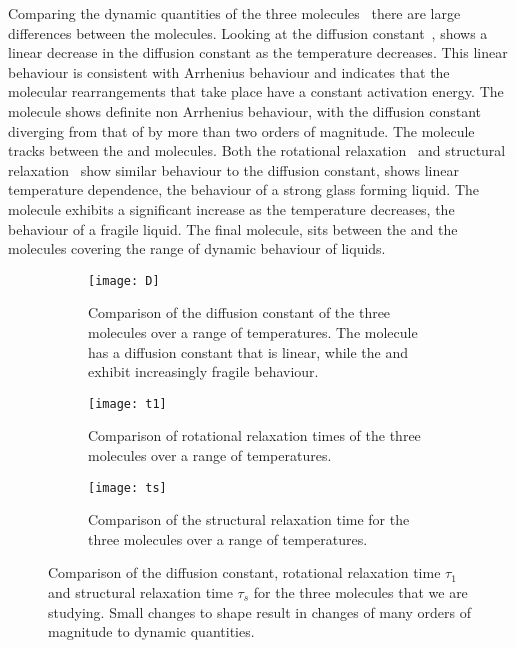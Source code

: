 Comparing the dynamic quantities of the three molecules~ there are large differences between the molecules. Looking at the diffusion constant~, \done shows a linear decrease in the diffusion constant as the temperature decreases. This linear behaviour is consistent with Arrhenius behaviour and indicates that the molecular rearrangements that take place have a constant activation energy. The \dcon molecule shows definite non Arrhenius behaviour, with the diffusion constant diverging from that of \done by more than two orders of magnitude. The \tri molecule tracks between the \done and \dcon molecules. Both the rotational relaxation~ and structural relaxation~ show similar behaviour to the diffusion constant, \done shows linear temperature dependence, the behaviour of a strong glass forming liquid. The \dcon molecule exhibits a significant increase as the temperature decreases, the behaviour of a fragile liquid. The final molecule, \tri sits between the \done and the \dcon molecules covering the range of dynamic behaviour of liquids.

\begin{figure}
    \centering
    \begin{subfigure}{\linewidth}
        \centering
        \texttt{[image: D]}
        \caption{Comparison of the diffusion constant of the three molecules over a range of temperatures. The \done molecule has a diffusion constant that is linear, while the \tri and \scon exhibit increasingly fragile behaviour.}
        \label{fig:diffusion constant}
    \end{subfigure}
    \begin{subfigure}{\linewidth}
        \centering
        \texttt{[image: t1]}
        \caption{Comparison of rotational relaxation times of the three molecules over a range of temperatures.}
        \label{fig:tau1}
    \end{subfigure}
    \begin{subfigure}{\textwidth}
        \centering
        \texttt{[image: ts]}
        \caption{Comparison of the structural relaxation time for the three molecules over a range of temperatures.}
        \label{fig:struct relax}
    \end{subfigure}
    \caption{Comparison of the diffusion constant, rotational relaxation time $\tau_1$ and structural relaxation time $\tau_s$ for the three molecules that we are studying. Small changes to shape result in changes of many orders of magnitude to dynamic quantities.}
    \label{fig:dynamic comparison}
\end{figure}

